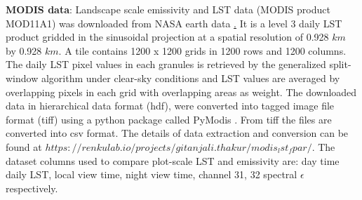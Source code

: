 \documentclass[fleqn,10pt]{wlscirep}
\begin{document}
{\textbf{MODIS data}:
Landscape scale emissivity and LST data (MODIS product MOD11A1) was downloaded from NASA earth data \href{https://lpdaac.usgs.gov/}. It is a level 3 daily LST product gridded in the sinusoidal projection at a spatial resolution of 0.928 $km$ by 0.928 $km$. A tile contains 1200 x 1200 grids in 1200 rows and 1200 columns\cite{wan2007collection}. The daily LST pixel values in each granules is retrieved by the generalized split-window algorithm under clear-sky conditions and LST values are averaged by overlapping pixels in each grid with overlapping areas as weight. The downloaded data in hierarchical data format (hdf), were converted into tagged image file format (tiff) using a python package called PyModis \cite{delucchi2014pymodis}. From tiff the files are converted into csv format. The details of data extraction and conversion can be found at $https://renkulab.io/projects/gitanjali.thakur/modis_lst_fpar/$. The dataset columns used to compare plot-scale LST and emissivity are: day time daily LST, local view time, night view time, channel 31, 32  spectral $\epsilon$ respectively. 
 
}
\end{document}
